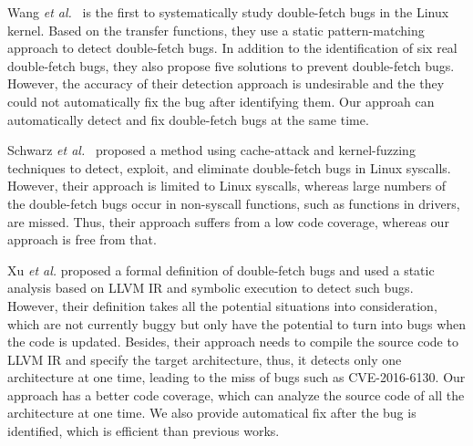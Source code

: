 \documentclass[10pt]{llncs}
\begin{document}

Wang \textit{et al.}~\cite{wang} is the first to systematically study double-fetch bugs in the Linux kernel. Based on the transfer functions, they use a static pattern-matching approach to detect double-fetch bugs. In addition to the identification of six real double-fetch bugs, they also propose five solutions to prevent double-fetch bugs. However, the accuracy of their detection approach is undesirable and the they could not automatically fix the bug after identifying them. %
Our approah can automatically detect and fix double-fetch bugs at the same time.

Schwarz \textit{et al.}~\cite{modern} proposed a method using cache-attack and kernel-fuzzing techniques  to detect, exploit, and eliminate double-fetch bugs in Linux syscalls. %
However, their approach is limited to Linux syscalls, whereas large numbers of the double-fetch bugs occur in non-syscall functions, such as functions in drivers, are missed. Thus, their approach suffers from a low code coverage, whereas our approach is free from that.%

Xu \textit{et al.}\cite{precise} proposed a formal definition of double-fetch bugs and used a static analysis based on LLVM IR and symbolic execution to detect such bugs. However, their definition takes all the potential situations into consideration, which are not currently buggy but only have the potential to turn into bugs when the code is updated. Besides, their approach needs to compile the source code to LLVM IR and specify the target architecture, thus, it detects only one architecture at one time, leading to the miss of bugs such as CVE-2016-6130. Our approach has a better code coverage, which can analyze the source code of all the architecture at one time. We also provide automatical fix after the bug is identified, which is efficient than previous works.
\end{document}
